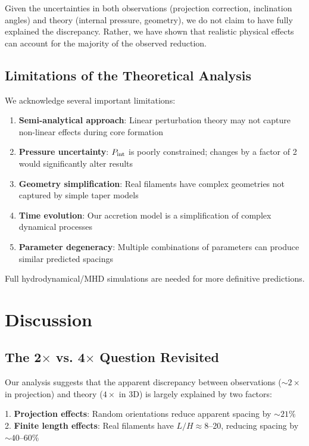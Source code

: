 \documentclass[11pt,a4paper]{article}
\begin{document}
Given the uncertainties in both observations (projection correction, inclination angles) and theory (internal pressure, geometry), we do not claim to have fully explained the discrepancy. Rather, we have shown that realistic physical effects can account for the majority of the observed reduction.

\subsection{Limitations of the Theoretical Analysis}

We acknowledge several important limitations:

\begin{enumerate}
    \item \textbf{Semi-analytical approach}: Linear perturbation theory may not capture non-linear effects during core formation
    \item \textbf{Pressure uncertainty}: $P_{\rm int}$ is poorly constrained; changes by a factor of 2 would significantly alter results
    \item \textbf{Geometry simplification}: Real filaments have complex geometries not captured by simple taper models
    \item \textbf{Time evolution}: Our accretion model is a simplification of complex dynamical processes
    \item \textbf{Parameter degeneracy}: Multiple combinations of parameters can produce similar predicted spacings
\end{enumerate}

Full hydrodynamical/MHD simulations are needed for more definitive predictions.

\section{Discussion}

\subsection{The 2$\times$ vs. 4$\times$ Question Revisited}

Our analysis suggests that the apparent discrepancy between observations ($\sim2\times$ in projection) and theory ($4\times$ in 3D) is largely explained by two factors:

1. \textbf{Projection effects}: Random orientations reduce apparent spacing by $\sim21\%$
2. \textbf{Finite length effects}: Real filaments have $L/H \approx 8$--20, reducing spacing by $\sim40$--60\%
\end{document}

